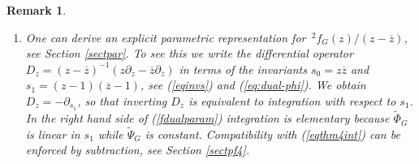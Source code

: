 \documentclass[oneside]{amsart}
\newcommand{\zz}{{\overline{z}}}
\theoremstyle{plain}
\newtheorem{remark}[thm]{Remark}
\begin{document}
\begin{remark}\label{remarkgeg}\mbox{}
\begin{enumerate}
\item One can derive an explicit parametric representation for $\,{}^2\!f_G(z)/(z-\zz)$, see Section \ref{sectpar}. To see this we write the differential operator
$D_z=(z-\zz)^{-1}(z\partial_z-\zz\partial_\zz)$ in terms of the invariants $s_0=z\zz$ and $s_1=(z-1)(\zz-1)$, see (\ref{eqinvs}) and (\ref{eq:dual-phi}).
We obtain $D_z=-\partial_{s_1}$, so that inverting $D_z$ is equivalent to integration with respect to $s_1$. In the right hand side of (\ref{fdualparam}) integration
is elementary because $\widetilde{\Phi}_G$ is linear in $s_1$ while $\widetilde{\Psi}_G$ is constant. Compatibility with (\ref{eqthm4int}) can be enforced by subtraction,
see Section \ref{sectpf4}.


\end{enumerate}
\end{remark}
\end{document}
